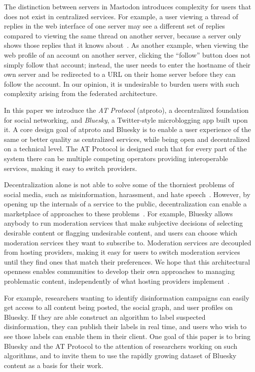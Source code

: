 \documentclass[sigconf]{acmart}
\begin{document}
The distinction between servers in Mastodon introduces complexity for users that does not exist in centralized services.
For example, a user viewing a thread of replies in the web interface of one server may see a different set of replies compared to viewing the same thread on another server, because a server only shows those replies that it knows about~\cite{Adida:2022}.
As another example, when viewing the web profile of an account on another server, clicking the ``follow'' button does not simply follow that account; instead, the user needs to enter the hostname of their own server and be redirected to a URL on their home server before they can follow the account.
In our opinion, it is undesirable to burden users with such complexity arising from the federated architecture.

In this paper we introduce the \emph{AT Protocol} (atproto), a decentralized foundation for social networking, and \emph{Bluesky}, a Twitter-style microblogging app built upon it.
A core design goal of atproto and Bluesky is to enable a user experience of the same or better quality as centralized services, while being open and decentralized on a technical level.
The AT Protocol is designed such that for every part of the system there can be multiple competing operators providing interoperable services, making it easy to switch providers.

Decentralization alone is not able to solve some of the thorniest problems of social media, such as misinformation, harassment, and hate speech~\cite{Roth:2023}.
However, by opening up the internals of a service to the public, decentralization can enable a marketplace of approaches to these problems~\cite{Masnick:2019}.
For example, Bluesky allows anybody to run moderation services that make subjective decisions of selecting desirable content or flagging undesirable content, and users can choose which moderation services they want to subscribe to.
Moderation services are decoupled from hosting providers, making it easy for users to switch moderation services until they find ones that match their preferences.
We hope that this architectural openness enables communities to develop their own approaches to managing problematic content, independently of what hosting providers implement~\cite{Masnick:2019}.

For example, researchers wanting to identify disinformation campaigns can easily get access to all content being posted, the social graph, and user profiles on Bluesky.
If they are able construct an algorithm to label suspected disinformation, they can publish their labels in real time, and users who wish to see those labels can enable them in their client.
One goal of this paper is to bring Bluesky and the AT Protocol to the attention of researchers working on such algorithms, and to invite them to use the rapidly growing dataset of Bluesky content as a basis for their work.
\end{document}
